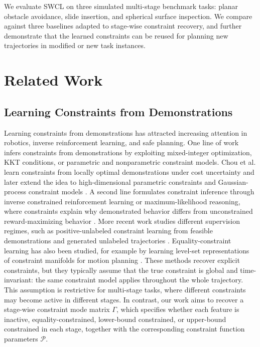 \documentclass[lettersize,journal]{IEEEtran}
\begin{document}
We evaluate SWCL on three simulated multi-stage benchmark tasks: planar obstacle avoidance, slide insertion, and spherical surface inspection. We compare against three baselines adapted to stage-wise constraint recovery, and further demonstrate that the learned constraints can be reused for planning new trajectories in modified or new task instances.

\section{Related Work}
\label{sec:related_work}

\subsection{Learning Constraints from Demonstrations}

Learning constraints from demonstrations has attracted increasing attention in robotics, inverse reinforcement learning, and safe planning. One line of work infers constraints from demonstrations by exploiting mixed-integer optimization, KKT conditions, or parametric and nonparametric constraint models. Chou et al. learn constraints from locally optimal demonstrations under cost uncertainty and later extend the idea to high-dimensional parametric constraints and Gaussian-process constraint models \cite{chou2020local,chou2020parametric,chou2022gp}. A second line formulates constraint inference through inverse constrained reinforcement learning or maximum-likelihood reasoning, where constraints explain why demonstrated behavior differs from unconstrained reward-maximizing behavior \cite{scobee2020maximum,malik2021inverse,liu2023benchmarking}. More recent work studies different supervision regimes, such as positive-unlabeled constraint learning from feasible demonstrations and generated unlabeled trajectories \cite{peng2025pucl}. Equality-constraint learning has also been studied, for example by learning level-set representations of constraint manifolds for motion planning \cite{sutanto2021ecomann}. These methods recover explicit constraints, but they typically assume that the true constraint is global and time-invariant: the same constraint model applies throughout the whole trajectory. This assumption is restrictive for multi-stage tasks, where different constraints may become active in different stages. In contrast, our work aims to recover a stage-wise constraint mode matrix $\Gamma$, which specifies whether each feature is inactive, equality-constrained, lower-bound constrained, or upper-bound constrained in each stage, together with the corresponding constraint function parameters $\mathcal{P}$.
\end{document}
